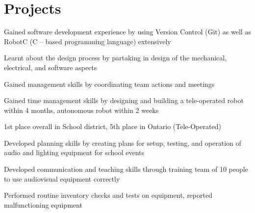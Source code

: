 \documentclass[]{resume}
\begin{document}
\begin{minipage}[t]{0.66\textwidth}
\section {Projects}
\begin{tightemize}
\item Gained software development experience by using Version Control (Git) as well as RobotC (C – based programming language) extensively 
\item Learnt about the design process by partaking in design of the mechanical, electrical, and software aspects 
\item Gained management skills by coordinating team actions and meetings \item Gained time management skills by designing and building a tele-operated robot within 4 months, autonomous robot within 2 weeks 
\item 1st place overall in School district, 5th place in Ontario (Tele-Operated) 
\end{tightemize}
\sectionsep

\begin{tightemize}
\item Developed planning skills by creating plans for setup, testing, and operation of audio and lighting equipment for school events 
\item Developed communication and teaching skills through training team of 10 people to use audiovisual equipment correctly 
\item Performed routine inventory checks and tests on equipment, reported malfunctioning equipment
\end{tightemize}
\sectionsep


\sectionsep 
\end{minipage} 
\end{document}
